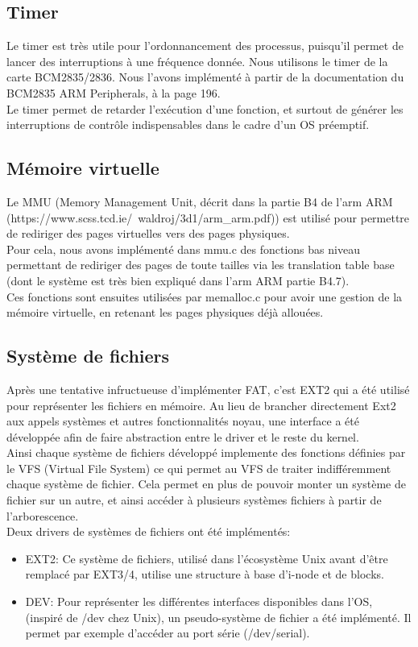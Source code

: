 \documentclass[a4paper]{article}
\begin{document}
\subsection{Timer}
Le timer est très utile pour l'ordonnancement des processus, puisqu'il permet de
lancer des interruptions à une fréquence donnée. Nous utilisons le timer de la
carte BCM2835/2836. Nous l'avons implémenté à partir de la documentation du
BCM2835 ARM Peripherals, à la page 196.\\

Le timer permet de retarder l'exécution d'une fonction, et surtout de générer
les interruptions de contrôle indispensables dans le cadre d'un OS préemptif.

\subsection{Mémoire virtuelle}

Le MMU (Memory Management Unit, décrit dans la partie B4 de l'arm ARM
(https://www.scss.tcd.ie/~waldroj/3d1/arm\_arm.pdf)) est utilisé pour permettre
de rediriger des pages virtuelles vers des pages physiques.\\

Pour cela, nous avons implémenté dans mmu.c des fonctions bas niveau permettant de
rediriger des pages de toute tailles via les translation table base (dont le
système est très bien expliqué dans l'arm ARM partie B4.7).\\

Ces fonctions sont ensuites utilisées par memalloc.c pour avoir une gestion de
la mémoire virtuelle, en retenant les pages physiques déjà allouées.

\subsection{Système de fichiers}
Après une tentative infructueuse d'implémenter FAT, c'est EXT2 qui a été utilisé
pour représenter les fichiers en mémoire.
Au lieu de brancher directement Ext2 aux appels systèmes et autres fonctionnalités
noyau, une interface a été développée afin de faire abstraction entre le driver
et le reste du kernel. \\
Ainsi chaque système de fichiers développé implemente des fonctions définies
par le VFS (Virtual File System) ce qui permet au VFS de traiter indifféremment
chaque système de fichier. Cela permet en plus de pouvoir monter un système de
fichier sur un autre, et ainsi accéder à plusieurs systèmes fichiers à partir de
l'arborescence. \\
Deux drivers de systèmes de fichiers ont été implémentés:
\begin{itemize}
	\item EXT2: Ce système de fichiers, utilisé dans l'écosystème Unix avant
	d'être remplacé par EXT3/4, utilise une structure à base d'i-node et de blocks.
	\item DEV: Pour représenter les différentes interfaces disponibles dans l'OS,
	(inspiré de /dev chez Unix), un pseudo-système de fichier a été implémenté.
	Il permet par exemple d'accéder au port série (/dev/serial).
\end{itemize}
\end{document}
